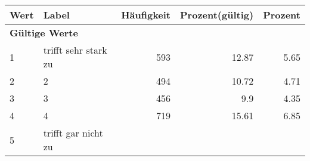      \begin{longtable}{lXrrr}
     \toprule
     \textbf{Wert} & \textbf{Label} & \textbf{Häufigkeit} & \textbf{Prozent(gültig)} & \textbf{Prozent} \\
     \endhead
     \midrule
     \multicolumn{5}{l}{\textbf{Gültige Werte}}\\

     1 &
     \multicolumn{1}{X}{ trifft sehr stark zu   } &


       \num{593} &
       \num[round-mode=places,round-precision=2]{12,87} &
         \num[round-mode=places,round-precision=2]{5,65} \\

     2 &
     \multicolumn{1}{X}{ 2   } &


       \num{494} &
       \num[round-mode=places,round-precision=2]{10,72} &
         \num[round-mode=places,round-precision=2]{4,71} \\

     3 &
     \multicolumn{1}{X}{ 3   } &


       \num{456} &
       \num[round-mode=places,round-precision=2]{9,9} &
         \num[round-mode=places,round-precision=2]{4,35} \\

     4 &
     \multicolumn{1}{X}{ 4   } &


       \num{719} &
       \num[round-mode=places,round-precision=2]{15,61} &
         \num[round-mode=places,round-precision=2]{6,85} \\

     5 &
     \multicolumn{1}{X}{ trifft gar nicht zu   } &



\end{longtable}
